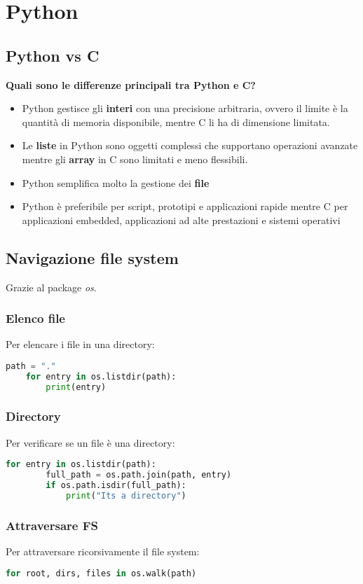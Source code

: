 \newpage
\section{Python}
\subsection{Python vs C}
\textbf{Quali sono le differenze principali tra Python e C?}\\
\begin{itemize}
	\item Python gestisce gli \textbf{interi} con una precisione arbitraria, ovvero il limite è la quantità di memoria disponibile, mentre C li ha di dimensione limitata.
	\item Le \textbf{liste} in Python sono oggetti complessi che supportano operazioni avanzate mentre gli \textbf{array} in C sono limitati e meno flessibili.
	\item Python semplifica molto la gestione dei \textbf{file}
	\item Python è preferibile per script, prototipi e applicazioni rapide mentre C per applicazioni embedded, applicazioni ad alte prestazioni e sistemi operativi
\end{itemize}

\subsection{Navigazione file system}
Grazie al package \textit{os}.
\subsubsection{Elenco file}
Per elencare i file in una directory:
\begin{lstlisting}[language=Python]
	path = "."
	for entry in os.listdir(path):
		print(entry)
\end{lstlisting}
\subsubsection{Directory}
Per verificare se un file è una directory:
\begin{lstlisting}[language=Python]
	for entry in os.listdir(path):
		full_path = os.path.join(path, entry)
		if os.path.isdir(full_path):
			print("Its a directory")
\end{lstlisting}
\subsubsection{Attraversare FS}
Per attraversare ricorsivamente il file system:
\begin{lstlisting}[language=Python]
	for root, dirs, files in os.walk(path)
\end{lstlisting}

